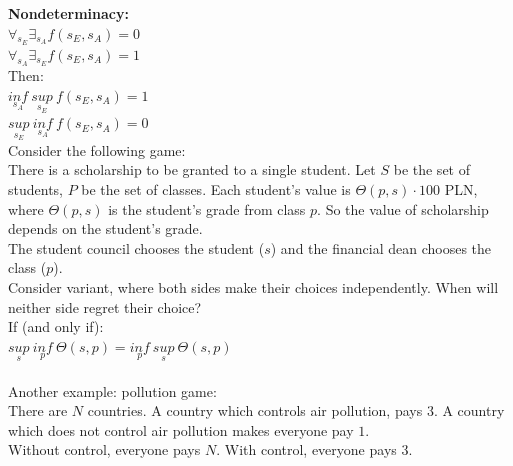 \noindent
\textbf{Nondeterminacy:}\\
$\forall_{s_E} \exists_{s_A} f(s_E, s_A) = 0$\\
$\forall_{s_A} \exists_{s_E} f(s_E, s_A) = 1$\\
Then:\\
$\underset{s_A}{inf}\ \underset{s_E}{sup}\ f(s_E, s_A) = 1$\\
$\underset{s_E}{sup}\ \underset{s_A}{inf}\ f(s_E, s_A) = 0$\\

\noindent
Consider the following game:\\
There is a scholarship to be granted to a single student. Let $S$ be the set of students, $P$ be the set of classes.
Each student's value is $\Theta(p, s) \cdot 100$ PLN, where $\Theta(p, s)$ is the student's grade from class $p$.
So the value of scholarship depends on the student's grade.\\
The student council chooses the student ($s$) and the financial dean chooses the class ($p$).\\
Consider variant, where both sides make their choices independently. When will neither side regret their choice?\\

\noindent
If (and only if):\\
$\underset{s}{sup}\ \underset{p}{inf}\ \Theta(s, p) = \underset{p}{inf}\ \underset{s}{sup}\ \Theta(s, p)$\\\\

\noindent
Another example: pollution game:\\
There are $N$ countries. A country which controls air pollution, pays $3$. A country which does not control air pollution makes everyone pay $1$.\\
Without control, everyone pays $N$. With control, everyone pays $3$.

